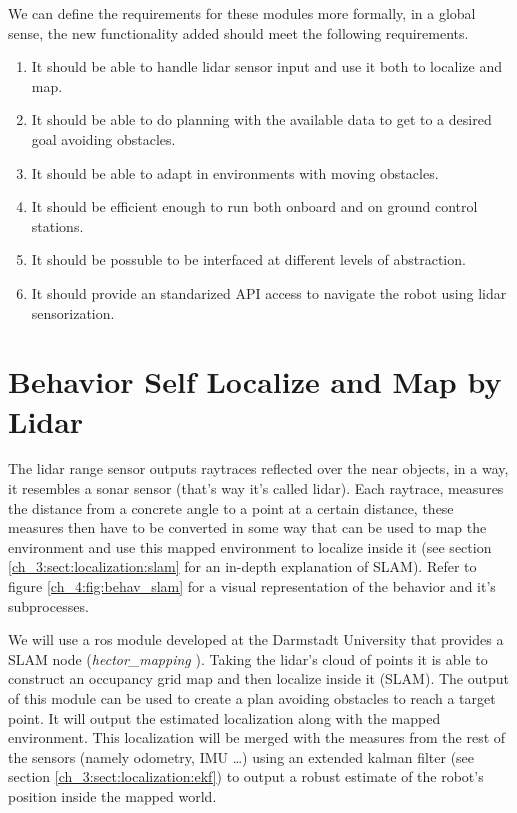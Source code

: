   \pagebreak

  We can define the requirements for these modules more formally, in a global sense, the new functionality added should meet the following requirements.
  
  \begin{enumerate}
    \item It should be able to handle lidar sensor input and use it both to localize and map.
    \item It should be able to do planning with the available data to get to a desired goal avoiding obstacles.
    \item It should be able to adapt in environments with moving obstacles.
    \item It should be efficient enough to run both onboard and on ground control stations.
    \item It should be possuble to be interfaced at different levels of abstraction.
    \item It should provide an standarized API access to navigate the robot using lidar sensorization.
  \end{enumerate}

\section{Behavior Self Localize and Map by Lidar} \label{ch_4:sect:behav_slam}

  The lidar range sensor outputs raytraces reflected over the near objects, in a way, it resembles a sonar sensor (that's way it's called lidar). Each raytrace, measures the distance from a concrete angle to a point at a certain distance, these measures then have to be converted in some way that can be used to map the environment and use this mapped environment to localize inside it (see section \ref{ch_3:sect:localization:slam} for an in-depth explanation of SLAM). Refer to figure \ref{ch_4:fig:behav_slam} for a visual representation of the behavior and it's subprocesses.

  We will use a ros module developed at the Darmstadt University that provides a SLAM node (\textit{hector\_mapping} \cite{hector_slam}). Taking the lidar's cloud of points it is able to construct an occupancy grid map and then localize inside it (SLAM). The output of this module can be used to create a plan avoiding obstacles to reach a target point. It will output the estimated localization along with the mapped environment. This localization will be merged with the measures from the rest of the sensors (namely odometry, IMU \dots) using an extended kalman filter (see section \ref{ch_3:sect:localization:ekf}) to output a robust estimate of the robot's position inside the mapped world. 

